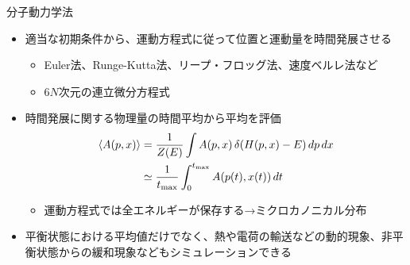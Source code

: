 
\begin{frame}[t,fragile]{分子動力学法}
  \begin{itemize}
    \setlength{\itemsep}{1em}
  \item 適当な初期条件から、運動方程式に従って位置と運動量を時間発展させる
    \begin{itemize}
    \item Euler法、Runge-Kutta法、リープ・フロッグ法、速度ベルレ法など
    \item $6N$次元の連立微分方程式
    \end{itemize}
  \item 時間発展に関する物理量の時間平均から平均を評価
    \begin{align*}
      \langle A(p,x) \rangle &= \frac{1}{Z(E)} \int A(p,x) \, \delta(H(p,x)-E) \, dp \, dx \\
      &\simeq \frac{1}{t_{\rm max}} \int_0^{t_{\rm max}} A(p(t),x(t)) \, dt
    \end{align*}
    \begin{itemize}
    \item 運動方程式では全エネルギーが保存する→ミクロカノニカル分布
    \end{itemize}
  \item 平衡状態における平均値だけでなく、熱や電荷の輸送などの動的現象、非平衡状態からの緩和現象などもシミュレーションできる
  \end{itemize}
\end{frame}
